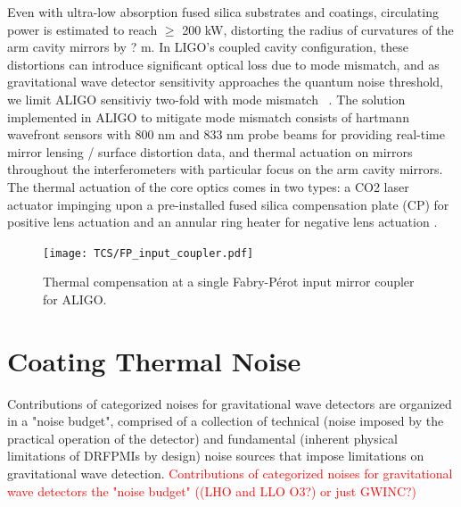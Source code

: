 Even with ultra-low absorption fused silica substrates and coatings, circulating power is estimated to reach $\geq$ 200 kW, distorting the radius of curvatures of the arm cavity mirrors by ? m. In LIGO's coupled cavity configuration, these distortions can introduce significant optical loss due to mode mismatch, and as gravitational wave detector sensitivity approaches the quantum noise threshold, we limit ALIGO sensitiviy two-fold with mode mismatch ~\cite{}. The solution implemented in ALIGO to mitigate mode mismatch consists of hartmann wavefront sensors with 800 nm and 833 nm probe beams for providing real-time mirror lensing / surface distortion data, and thermal actuation on mirrors throughout the interferometers with particular focus on the arm cavity mirrors. The thermal actuation of the core optics comes in two types: a CO2 laser actuator impinging upon a pre-installed fused silica compensation plate (CP) for positive lens actuation and an annular ring heater for negative lens actuation \cite{}. 

\begin{figure}[H]
	\texttt{[image: TCS/FP\_input\_coupler.pdf]}
\caption{Thermal compensation at a single Fabry-P\'{e}rot input mirror coupler for ALIGO.}
 \label{fig:meas}
\end{figure}

\section{Coating Thermal Noise}
Contributions of categorized noises for gravitational wave detectors are organized in a "noise budget", comprised of a collection of technical (noise imposed by the practical operation of the detector) and fundamental (inherent physical limitations of DRFPMIs by design) noise sources that impose limitations on gravitational wave detection.
\textcolor{red}{Contributions of categorized noises for gravitational wave detectors the "noise budget" ((LHO and LLO O3?) or just GWINC?)}

